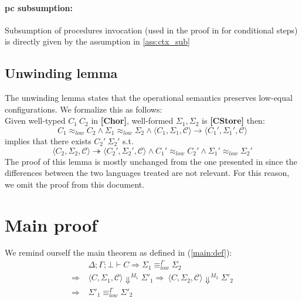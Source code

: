 \documentclass[12pt,a4paper,twoside]{book}
\begin{document}
\paragraph{pc subsumption:}
Subsumption of procedures invocation (used in the proof in \cite{myers2011proving} for conditional steps) is directly given by the assumption in \ref{ass:ctx_sub}

\subsection{Unwinding lemma}
The unwinding lemma states that the operational semantics preserves low-equal configurations. We formalize this as follows:\\
Given well-typed $C_1~C_2$ in \textbf{[Chor]}, well-formed $\Sigma_1, \Sigma_2$ is \textbf{[CStore]} then:
$$
C_1 \approx_{low} C_2 \land
\Sigma_1 \approx_{low} \Sigma_2 \land
\langle C_1, \Sigma_1, \mathscr{C} \rangle \rightarrow
\langle C_1', \Sigma_1', \mathscr{C} \rangle
$$
implies that there exists $C_2'~\Sigma_2'$ s.t.
\begin{equation}\label{aux:unw}
\langle C_2, \Sigma_2, \mathscr{C} \rangle \twoheadrightarrow
\langle C_2', \Sigma_2', \mathscr{C} \rangle
\land C_1' \approx_{low} C_2'
\land \Sigma_1' \approx_{low} \Sigma_2'
\end{equation}
The proof of this lemma is mostly unchanged from the one presented in \cite{myers2011proving} since the differences between the two languages treated are not relevant. For this reason, we omit the proof from this document.

\section{Main proof}
We remind ourself the main theorem as defined in (\ref{main:def}):
\begin{align*}
	&\Delta;\Gamma;\bot \vdash C \Rightarrow
	\Sigma_1 \equiv^\Gamma_{low} \Sigma_2 \\ \Rightarrow\ &\langle C, \Sigma_1, \mathscr{C}\rangle \Downarrow^{M_1} \Sigma'_1
	\Rightarrow\ \langle C, \Sigma_2, \mathscr{C}\rangle \Downarrow^{M_2} \Sigma'_2 \\ \Rightarrow\ &\Sigma'_1 \equiv^\Gamma_{low} \Sigma'_2
\end{align*}
\end{document}
